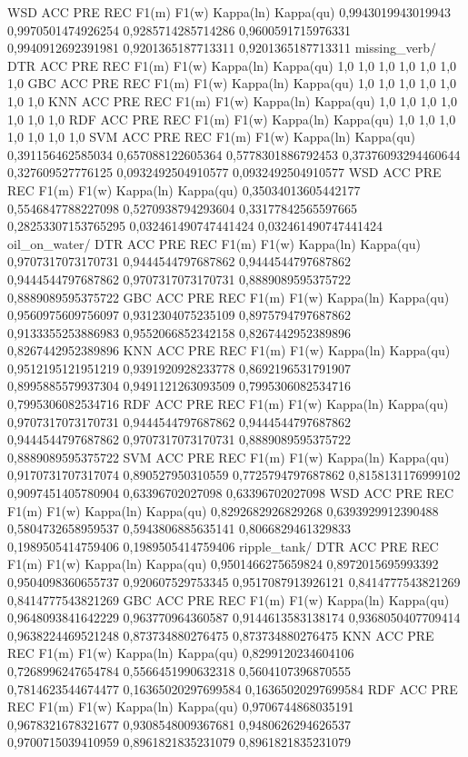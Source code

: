 WSD
ACC	PRE	REC	F1(m)	F1(w)	Kappa(ln)	Kappa(qu)
0,9943019943019943	0,9970501474926254	0,9285714285714286	0,9600591715976331	0,9940912692391981	0,9201365187713311	0,9201365187713311
missing_verb/
DTR
ACC	PRE	REC	F1(m)	F1(w)	Kappa(ln)	Kappa(qu)
1,0	1,0	1,0	1,0	1,0	1,0	1,0
GBC
ACC	PRE	REC	F1(m)	F1(w)	Kappa(ln)	Kappa(qu)
1,0	1,0	1,0	1,0	1,0	1,0	1,0
KNN
ACC	PRE	REC	F1(m)	F1(w)	Kappa(ln)	Kappa(qu)
1,0	1,0	1,0	1,0	1,0	1,0	1,0
RDF
ACC	PRE	REC	F1(m)	F1(w)	Kappa(ln)	Kappa(qu)
1,0	1,0	1,0	1,0	1,0	1,0	1,0
SVM
ACC	PRE	REC	F1(m)	F1(w)	Kappa(ln)	Kappa(qu)
0,391156462585034	0,657088122605364	0,5778301886792453	0,37376093294460644	0,327609527776125	0,0932492504910577	0,0932492504910577
WSD
ACC	PRE	REC	F1(m)	F1(w)	Kappa(ln)	Kappa(qu)
0,35034013605442177	0,5546847788227098	0,5270938794293604	0,33177842565597665	0,28253307153765295	0,032461490747441424	0,032461490747441424
oil_on_water/
DTR
ACC	PRE	REC	F1(m)	F1(w)	Kappa(ln)	Kappa(qu)
0,9707317073170731	0,9444544797687862	0,9444544797687862	0,9444544797687862	0,9707317073170731	0,8889089595375722	0,8889089595375722
GBC
ACC	PRE	REC	F1(m)	F1(w)	Kappa(ln)	Kappa(qu)
0,9560975609756097	0,9312304075235109	0,8975794797687862	0,9133355253886983	0,9552066852342158	0,8267442952389896	0,8267442952389896
KNN
ACC	PRE	REC	F1(m)	F1(w)	Kappa(ln)	Kappa(qu)
0,9512195121951219	0,9391920928233778	0,8692196531791907	0,8995885579937304	0,9491121263093509	0,7995306082534716	0,7995306082534716
RDF
ACC	PRE	REC	F1(m)	F1(w)	Kappa(ln)	Kappa(qu)
0,9707317073170731	0,9444544797687862	0,9444544797687862	0,9444544797687862	0,9707317073170731	0,8889089595375722	0,8889089595375722
SVM
ACC	PRE	REC	F1(m)	F1(w)	Kappa(ln)	Kappa(qu)
0,9170731707317074	0,890527950310559	0,7725794797687862	0,8158131176999102	0,9097451405780904	0,63396702027098	0,63396702027098
WSD
ACC	PRE	REC	F1(m)	F1(w)	Kappa(ln)	Kappa(qu)
0,8292682926829268	0,6393929912390488	0,5804732658959537	0,5943806885635141	0,8066829461329833	0,1989505414759406	0,1989505414759406
ripple_tank/
DTR
ACC	PRE	REC	F1(m)	F1(w)	Kappa(ln)	Kappa(qu)
0,9501466275659824	0,8972015695993392	0,9504098360655737	0,920607529753345	0,9517087913926121	0,8414777543821269	0,8414777543821269
GBC
ACC	PRE	REC	F1(m)	F1(w)	Kappa(ln)	Kappa(qu)
0,9648093841642229	0,963770964360587	0,9144613583138174	0,9368050407709414	0,9638224469521248	0,873734880276475	0,873734880276475
KNN
ACC	PRE	REC	F1(m)	F1(w)	Kappa(ln)	Kappa(qu)
0,8299120234604106	0,7268996247654784	0,5566451990632318	0,5604107396870555	0,7814623544674477	0,16365020297699584	0,16365020297699584
RDF
ACC	PRE	REC	F1(m)	F1(w)	Kappa(ln)	Kappa(qu)
0,9706744868035191	0,9678321678321677	0,9308548009367681	0,9480626294626537	0,9700715039410959	0,8961821835231079	0,8961821835231079
